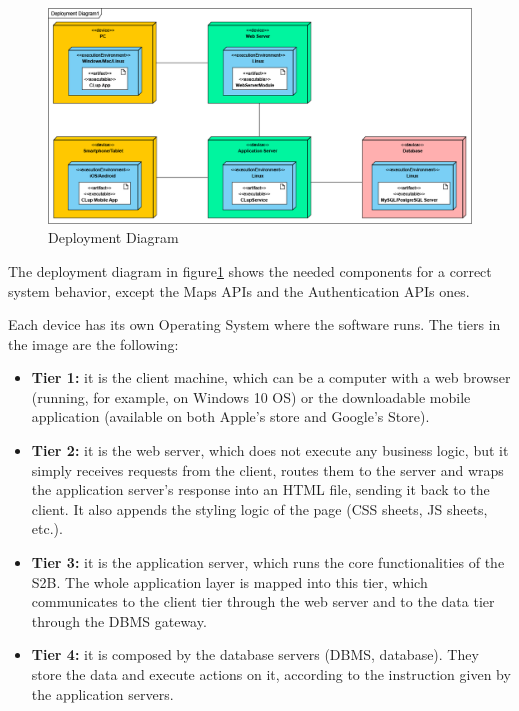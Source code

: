 \documentclass[table, 12pt]{article}
\begin{document}
\begin{figure}[H]
    \begin{center}
        \includegraphics[width=\textwidth]{assets/Deployment-Diagram/DeploymentDiagram1.png}
        \caption{Deployment Diagram}\label{deployment_diagram}
    \end{center}
\end{figure}

The deployment diagram in figure\ref{deployment_diagram} shows the needed components for a correct system behavior, except the Maps APIs and the Authentication APIs ones.

Each device has its own Operating System where the software runs. The tiers in the image are the following:
\begin{itemize}
    \item \textbf{Tier 1:} it is the client machine, which can be a computer with a web browser (running, for example, on Windows 10 OS) or the downloadable mobile application (available on both Apple's store and Google's Store).
    \item \textbf{Tier 2:} it is the web server, which does not execute any business logic, but it simply receives requests from the client, routes them to the server and wraps the application server's response into an HTML file, sending it back to the client. It also appends the styling logic of the page (CSS sheets, JS sheets, etc.).
    \item \textbf{Tier 3:} it is the application server, which runs the core functionalities of the S2B. The whole application layer is mapped into this tier, which communicates to the client tier through the web server and to the data tier through the DBMS gateway.
    \item \textbf{Tier 4:} it is composed by the database servers (DBMS, database). They store the data and execute actions on it, according to the instruction given by the application servers.
\end{itemize}
\end{document}
